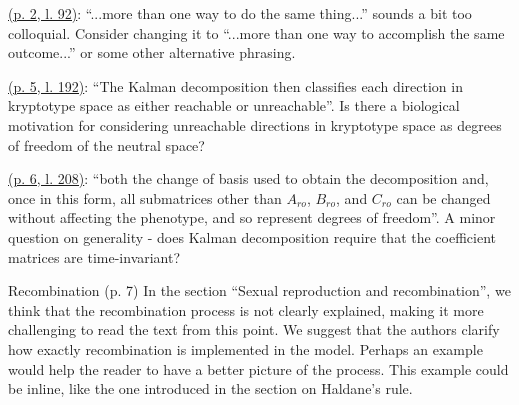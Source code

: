 
\begin{point}{}
  \hyperlink{rev2:2}{(p. 2, l. 92)}: ``...more than one way to do the same thing...'' sounds a bit too colloquial. Consider changing it to ``...more than one way to accomplish the same outcome...'' or some other alternative phrasing.
\end{point}


\begin{point}{}
  \hyperlink{rev2:3}{(p. 5, l. 192)}: ``The Kalman decomposition then classifies each direction in kryptotype space as either reachable or unreachable''. Is there a biological motivation for considering unreachable directions in kryptotype space as degrees of freedom of the neutral space?
\end{point}


\begin{point}{}
\hyperlink{rev2:4}{(p. 6, l. 208)}: ``both the change of basis used to obtain the decomposition and, once in this form, all submatrices other than $A_{ro}$, $B_{ro}$, and $C_{ro}$ can be changed without affecting the phenotype, and so represent degrees of freedom''. A minor question on generality - does Kalman decomposition require that the coefficient matrices are time-invariant?
\end{point}


\begin{point}{Recombination}
(p. 7) In the section ``Sexual reproduction and recombination'', we think that the recombination process is not clearly explained, making it more challenging to read the text from this point. We suggest that the authors clarify how exactly recombination is implemented in the model. Perhaps an example would help the reader to have a better picture of the process. This example could be inline, like the one introduced in the section on Haldane's rule.
\end{point}

